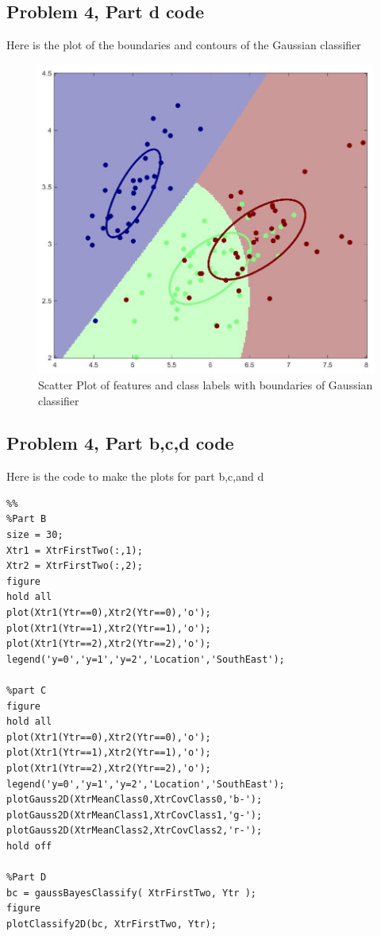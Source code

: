 \documentclass[11pt,psfig]{article}
\begin{document}
\newpage

\subsection*{Problem 4, Part d code}

Here is the plot of the boundaries and contours of the Gaussian classifier

\begin{figure}[H]
\centering
\includegraphics[width=\columnwidth]{prob4dPlot.jpg}
\caption{Scatter Plot of features and class labels with boundaries of Gaussian classifier}
\end{figure}

\newpage

\subsection*{Problem 4, Part b,c,d code}

Here is the code to make the plots for part b,c,and d
\begin{verbatim}
%%
%Part B
size = 30;
Xtr1 = XtrFirstTwo(:,1);
Xtr2 = XtrFirstTwo(:,2);
figure
hold all
plot(Xtr1(Ytr==0),Xtr2(Ytr==0),'o');
plot(Xtr1(Ytr==1),Xtr2(Ytr==1),'o');
plot(Xtr1(Ytr==2),Xtr2(Ytr==2),'o');
legend('y=0','y=1','y=2','Location','SouthEast');

%part C
figure
hold all
plot(Xtr1(Ytr==0),Xtr2(Ytr==0),'o');
plot(Xtr1(Ytr==1),Xtr2(Ytr==1),'o');
plot(Xtr1(Ytr==2),Xtr2(Ytr==2),'o');
legend('y=0','y=1','y=2','Location','SouthEast');
plotGauss2D(XtrMeanClass0,XtrCovClass0,'b-');
plotGauss2D(XtrMeanClass1,XtrCovClass1,'g-');
plotGauss2D(XtrMeanClass2,XtrCovClass2,'r-');
hold off

%Part D
bc = gaussBayesClassify( XtrFirstTwo, Ytr );
figure
plotClassify2D(bc, XtrFirstTwo, Ytr);
\end{verbatim}
\end{document}
